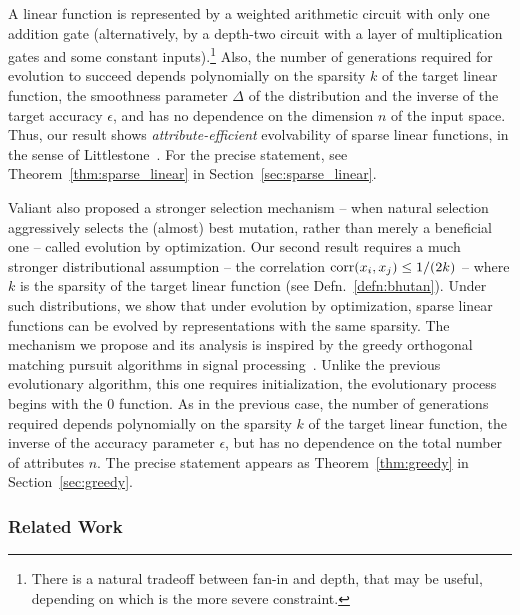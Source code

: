 \documentclass[11pt]{article}
\begin{document}
A linear function is represented by a weighted arithmetic circuit with only one
addition gate (alternatively, by a depth-two circuit with a layer of
multiplication gates and some constant inputs).\footnote{There is a natural
tradeoff between fan-in and depth, that may be useful, depending on which is
the more severe constraint.} Also, the number of generations required for
evolution to succeed depends polynomially on the sparsity $k$ of the target
linear function, the smoothness parameter $\Delta$ of the distribution and the inverse of
the target accuracy $\epsilon$, and has no dependence on the dimension $n$ of
the input space. Thus, our result shows \emph{attribute-efficient} evolvability
of sparse linear functions, in the sense of
Littlestone~\cite{Littlestone:1988}. For the precise statement, see
Theorem~\ref{thm:sparse_linear} in Section~\ref{sec:sparse_linear}.

Valiant also proposed a stronger selection mechanism -- when natural selection
aggressively selects the (almost) best mutation, rather than merely a beneficial
one -- called evolution by optimization. Our second result requires a much
stronger distributional assumption -- the correlation $\mathrm{corr}(x_i, x_j) \leq
1/(2k)$ -- where $k$ is the sparsity of the target  linear function (see
Defn.~\ref{defn:bhutan}). Under such distributions, we show that under evolution
by optimization, sparse linear functions can be evolved by representations with
the same sparsity. The mechanism we propose and its analysis is inspired by the
greedy orthogonal matching pursuit algorithms in signal
processing~\cite{Donoho:2006-recovery,Tropp:2004-greed}. Unlike the previous
evolutionary algorithm, this one requires initialization, \ie the evolutionary
process begins with the $0$ function. As in the previous case, the number of
generations required depends polynomially on the sparsity $k$ of the target
linear function, the inverse of the accuracy parameter $\epsilon$, but has no
dependence on the total number of attributes $n$. The precise statement appears
as Theorem~\ref{thm:greedy} in Section~\ref{sec:greedy}.

\subsubsection*{Related Work}
\end{document}
